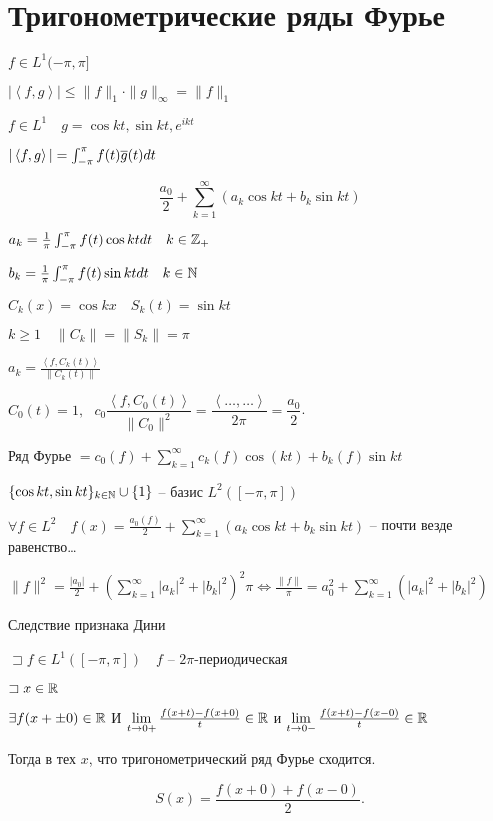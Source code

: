 \section{Тригонометрические ряды Фурье}

$f \in L^1(-\pi, \pi]$

$|\left<f, g \right>| \leqslant \|f\|_1 \cdot \|g\|_{\infty } = \|f\|_1$

$f\in L^1\quad g = \cos kt, \sin kt, e^{ikt}$

$|\left<f, g \right>| = \int_{-\pi}^{\pi} f(t)\overline{g}(t)dt$

\begin{definition}
    \[\frac{a_0}{2} + \sum_{k=1}^{\infty } \left( a_k\cos kt + b_k\sin kt \right)  \]

    $a_k = \frac{1}{\pi}\int_{-\pi}^{\pi}f(t)\cos kt dt\quad k\in \mathbb{Z}_+$

    $b_k = \frac{1}{\pi} \int_{-\pi}^{\pi}f(t)\sin kt dt\quad k\in \mathbb{N} $

    $C_k(x) = \cos k x\quad S_k(t) = \sin kt$

    $k \geqslant 1\quad \|C_k\| = \|S_k\| = \pi$

    $a_k = \frac{\left<f, C_k(t) \right>}{\|C_k(t)\|}$

    $C_0 (t) = 1, ~~~c_0 \dfrac{\left< f, C_0(t) \right> }{\| C_0\|^2} = \dfrac{\left< \dots, \dots \right>}{2\pi} = \dfrac{a_0}{2}$.

    Ряд Фурье $ = c_0(f) + \sum_{k=1}^{\infty } c_k(f)\cos(kt) + b_k(f)\sin k t $
\end{definition}

\begin{note}
    [Факт 1]

    $\{\cos kt, \sin kt\}_{k\in \mathbb{N} } \cup \{1\}$ -- базис $L^2\left( [-\pi, \pi] \right) $

    $\forall f\in L^2\quad f(x) = \frac{a_0(f)}{2} + \sum_{k=1}^{\infty } \left( a_k \cos kt + b_k\sin kt \right) $ -- почти везде равенство\ldots

    $\|f\|^2 = \frac{|a_0|}{2} + \left(\sum_{k=1}^{\infty } |a_k|^2 + |b_k|^2\right)^2 \pi \iff \frac{\|f\|}{\pi} = a_0^2 + \sum_{k=1}^{\infty }\left( |a_k|^2 + |b_k|^2 \right)  $
\end{note}

\begin{note}
    [Факт 2] Следствие признака Дини

    $\sqsupset  f\in L^1([-\pi, \pi])\quad f$ -- $2\pi$-периодическая

    $\sqsupset x\in \mathbb{R}$

    $\exists f(x+\pm 0)\in \mathbb{R}$ И $\lim_{t \to 0+} \frac{f(x+t) - f(x+0)}{t} \in \R $ и $\lim_{t \to 0-} \frac{f(x+t)- f(x-0)}{t}\in \R$

    Тогда в тех $x$, что тригонометрический ряд Фурье сходится.

    \[ S(x) = \frac{f(x+0) + f(x-0)}{2}. \]
\end{note}

